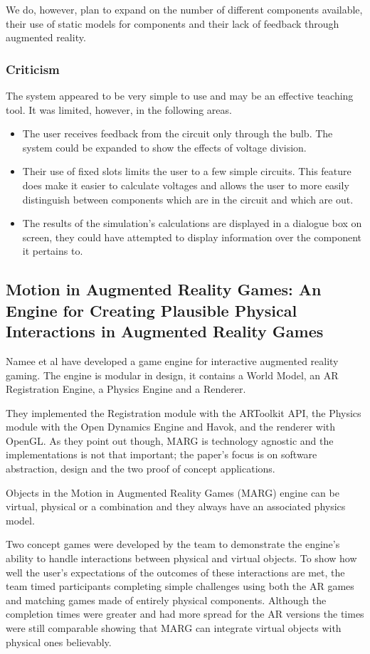 We do, however, plan to expand on the number of different components available, their use of static models for components and their lack of feedback through augmented reality.

\subsubsection{Criticism}
The system appeared to be very simple to use and may be an effective teaching tool. It was limited, however, in the following areas.
\begin{itemize}
\item The user receives feedback from the circuit only through the bulb. The system could be expanded to show the effects of voltage division.
\item Their use of fixed slots limits the user to a few simple circuits. This feature does make it easier to calculate voltages and allows the user to more easily distinguish between components which are in the circuit and which are out.
\item The results of the simulation's calculations are displayed in a dialogue box on screen, they could have attempted to display information over the component it pertains to.
\end{itemize}

\subsection{Motion in Augmented Reality Games: An Engine for Creating Plausible Physical Interactions in Augmented Reality Games}

Namee et al\cite{namee2010motion} have developed a game engine for interactive augmented reality gaming. The engine is modular in design, it contains a World Model, an AR Registration Engine, a Physics Engine and a Renderer.

They implemented the Registration module with the ARToolkit API, the Physics module with the Open Dynamics Engine and Havok, and the renderer with OpenGL. As they point out though, MARG is technology agnostic and the implementations is not that important; the paper's focus is on software abstraction, design and the two proof of concept applications.

Objects in the Motion in Augmented Reality Games (MARG) engine can be virtual, physical or a combination and they always have an associated physics model.

Two concept games were developed by the team to demonstrate the engine's ability to handle interactions between physical and virtual objects. To show how well the user's expectations of the outcomes of these interactions are met, the team timed participants completing simple challenges using both the AR games and matching games made of entirely physical components. Although the completion times were greater and had more spread for the AR versions the times were still comparable
showing that MARG can integrate virtual objects with physical ones believably.

